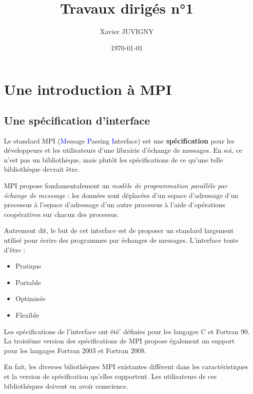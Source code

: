 \documentclass[11pt,a4paper]{article}
\author{Xavier JUVIGNY}
\date{\today}
\title{Travaux dirigés n°1}
\begin{document}
\lstset{escapechar=@,style=customcpp}

\maketitle
\tableofcontents


\section{Une introduction à MPI} 
\subsection{Une spécification d'interface}

Le standard MPI (\textcolor{blue}{M}essage \textcolor{blue}{P}assing \textcolor{blue}{I}nterface) est une 
\textbf{sp\'ecification} pour les d\'eveloppeurs et
les utilisateurs d'une librairie d'\'echange de messages. En soi, ce n'est pas un bibliothèque, mais plut\^ot
les sp\'ecifications de ce qu'une telle biblioth\`eque devrait \^etre.

MPI propose fondamentalement un \textsl{mod\`ele de programmation parall\`ele par \'echange de messsage} : les donn\'ees sont d\'eplac\'ees
d'un espace d'adressage d'un processus \`a l'espace d'adressage d'un autre processus \`a l'aide d'op\'erations
coop\'eratives sur chacun des processus.

Autrement dit, le but de cet interface est de proposer un standard largement utilis\'e
pour \'ecrire des programmes par \'echanges de messages. L'interface tente d'\^etre :
\begin{itemize}
\item Pratique
\item Portable
\item Optimis\'ee
\item Flexible
\end{itemize}

Les sp\'ecifications de l'interface ont \'et\'e' d\'efinies pour les langages C et Fortran 90. 
La troisi\`eme version des
sp\'ecifications de MPI propose \'egalement un support pour les langages Fortran 2003 et Fortran 2008.

En fait, les diverses bilioth\`eques MPI existantes diff\`erent dans les caract\'eristiques et la version de
sp\'ecification qu'elles supportent. Les utilisateurs de ces biblioth\`eques doivent en avoir conscience.
\end{document}
